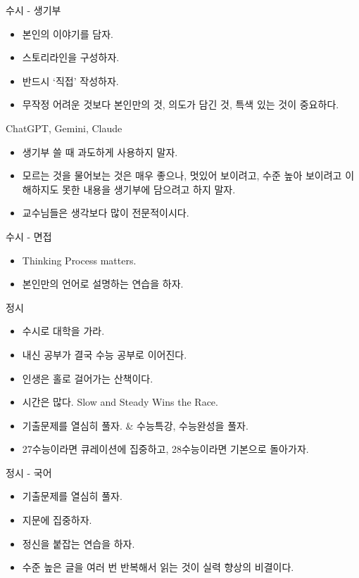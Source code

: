 \documentclass[12pt,aspectratio=169]{beamer}
\newenvironment{mainitemize}{\begin{itemize}\setlength{\itemsep}{0.72em}}{\end{itemize}}
\begin{document}
\begin{frame}{수시 - 생기부}
\begin{mainitemize}
  \item 본인의 이야기를 담자.
  \item 스토리라인을 구성하자.
  \item 반드시 ‘직접’ 작성하자.
  \item 무작정 어려운 것보다 본인만의 것, 의도가 담긴 것, 특색 있는 것이 중요하다.
\end{mainitemize}
\end{frame}

\begin{frame}{ChatGPT, Gemini, Claude}
\begin{mainitemize}
  \item 생기부 쓸 때 과도하게 사용하지 말자.
  \item 모르는 것을 물어보는 것은 매우 좋으나, 멋있어 보이려고, 수준 높아 보이려고 이해하지도 못한 내용을 생기부에 담으려고 하지 말자.
  \item 교수님들은 생각보다 많이 전문적이시다.
\end{mainitemize}
\end{frame}

\begin{frame}{수시 - 면접}
\begin{mainitemize}
  \item Thinking Process matters.
  \item 본인만의 언어로 설명하는 연습을 하자.
\end{mainitemize}
\end{frame}

\begin{frame}{정시}
\begin{mainitemize}
  \item 수시로 대학을 가라.
  \item 내신 공부가 결국 수능 공부로 이어진다.
  \item 인생은 홀로 걸어가는 산책이다.
  \item 시간은 많다. Slow and Steady Wins the Race.
  \item 기출문제를 열심히 풀자. \& 수능특강, 수능완성을 풀자.
  \item 27수능이라면 큐레이션에 집중하고, 28수능이라면 기본으로 돌아가자.
\end{mainitemize}
\end{frame}

\begin{frame}{정시 - 국어}
\begin{mainitemize}
  \item 기출문제를 열심히 풀자.
  \item 지문에 집중하자.
  \item 정신을 붙잡는 연습을 하자.
  \item 수준 높은 글을 여러 번 반복해서 읽는 것이 실력 향상의 비결이다.
\end{mainitemize}
\end{frame}
\end{document}

